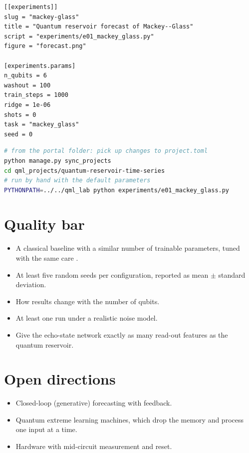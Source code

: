 \documentclass[11pt,a4paper]{article}
\begin{document}
\begin{lstlisting}[language={}]
[[experiments]]
slug = "mackey-glass"
title = "Quantum reservoir forecast of Mackey--Glass"
script = "experiments/e01_mackey_glass.py"
figure = "forecast.png"

[experiments.params]
n_qubits = 6
washout = 100
train_steps = 1000
ridge = 1e-06
shots = 0
task = "mackey_glass"
seed = 0
\end{lstlisting}

\begin{lstlisting}[language=bash]
# from the portal folder: pick up changes to project.toml
python manage.py sync_projects
cd qml_projects/quantum-reservoir-time-series
# run by hand with the default parameters
PYTHONPATH=../../qml_lab python experiments/e01_mackey_glass.py
\end{lstlisting}

\section{Quality bar}
\begin{itemize}
  \item A classical baseline with a similar number of trainable parameters, tuned with the same care \citep{bowles2024}.
  \item At least five random seeds per configuration, reported as mean $\pm$ standard deviation.
  \item How results change with the number of qubits.
  \item At least one run under a realistic noise model.
  \item Give the echo-state network exactly as many read-out features as the quantum reservoir.
\end{itemize}

\section{Open directions}
\begin{itemize}
  \item Closed-loop (generative) forecasting with feedback.
  \item Quantum extreme learning machines, which drop the memory and process one input at a time.
  \item Hardware with mid-circuit measurement and reset.
\end{itemize}
\end{document}
